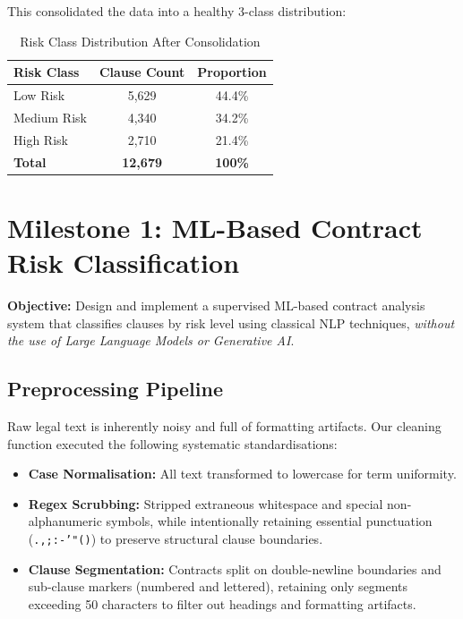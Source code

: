 \documentclass[12pt,a4paper]{article}
\begin{document}
This consolidated the data into a healthy 3-class distribution:

\begin{table}[h]
\centering
\begin{tabular}{@{}lcc@{}}
\toprule
\textbf{Risk Class} & \textbf{Clause Count} & \textbf{Proportion} \\
\midrule
Low Risk & 5,629 & 44.4\% \\
Medium Risk & 4,340 & 34.2\% \\
High Risk & 2,710 & 21.4\% \\
\midrule
\textbf{Total} & \textbf{12,679} & \textbf{100\%} \\
\bottomrule
\end{tabular}
\caption{Risk Class Distribution After Consolidation}
\end{table}

\section{Milestone 1: ML-Based Contract Risk Classification}
\label{sec:milestone1}

\begin{tcolorbox}[colback=gray!5, colframe=gray!50]
\textbf{Objective:} Design and implement a supervised ML-based contract analysis
system that classifies clauses by risk level using classical NLP techniques,
\textit{without the use of Large Language Models or Generative AI}.
\end{tcolorbox}

\subsection{Preprocessing Pipeline}

Raw legal text is inherently noisy and full of formatting artifacts. Our cleaning
function executed the following systematic standardisations:

\begin{itemize}[leftmargin=1.5cm]
    \item \textbf{Case Normalisation:} All text transformed to lowercase for term
    uniformity.

    \item \textbf{Regex Scrubbing:} Stripped extraneous whitespace and special
    non-alphanumeric symbols, while intentionally retaining essential punctuation
    (\texttt{.,;:-'"()}) to preserve structural clause boundaries.

    \item \textbf{Clause Segmentation:} Contracts split on double-newline boundaries
    and sub-clause markers (numbered and lettered), retaining only segments
    exceeding 50 characters to filter out headings and formatting artifacts.
\end{itemize}
\end{document}
